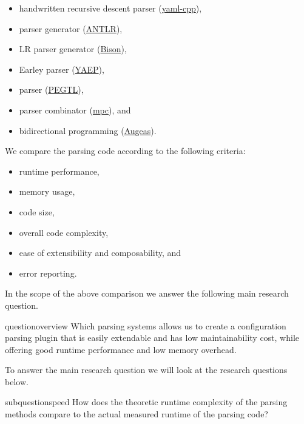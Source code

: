 \begin{itemize}
  \item handwritten recursive descent parser (\href{https://github.com/jbeder/yaml-cpp}{yaml-cpp}),
  \item {} parser generator (\href{http://www.antlr.org}{ANTLR}),
  \item LR parser generator (\href{https://www.gnu.org/software/bison}{Bison}),
  \item Earley parser (\href{https://github.com/vnmakarov/yaep}{YAEP}),
  \item {} parser (\href{https://github.com/taocpp/PEGTL}{PEGTL}),
  \item parser combinator (\href{https://github.com/orangeduck/mpc}{mpc}), and
  \item bidirectional programming (\href{http://augeas.net}{Augeas}).
\end{itemize}

We compare the parsing code according to the following criteria:

\begin{itemize}
  \item runtime performance,
  \item memory usage,
  \item code size,
  \item overall code complexity,
  \item ease of extensibility and composability, and
  \item error reporting.
\end{itemize}

In the scope of the above comparison we answer the following main research question.

\begin{restatable}{question}{overview}
   Which parsing systems allows us to create a configuration parsing plugin that is easily extendable and has low maintainability cost, while offering good runtime performance and low memory overhead.
\end{restatable}

To answer the main research question we will look at the research questions below.

\begin{restatable}{subquestion}{speed}
  \label{que:speed}
  How does the theoretic runtime complexity of the parsing methods compare to the actual measured runtime of the parsing code?
\end{restatable}

